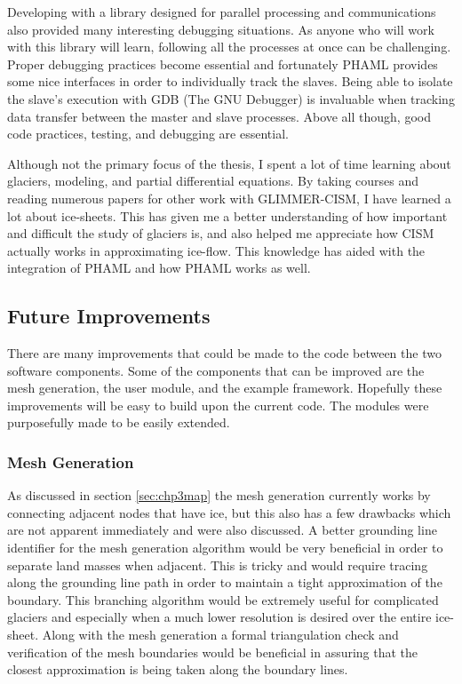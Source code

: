 Developing with a library designed for parallel processing and communications also provided many interesting debugging situations.  As anyone who will work with this library will learn, following all the processes at once can be challenging.  Proper debugging practices become essential and fortunately PHAML provides some nice interfaces in order to individually track the slaves.  Being able to isolate the slave's execution with GDB (The GNU Debugger) is invaluable when tracking data transfer between the master and slave processes.  Above all though, good code practices, testing, and debugging are essential.

Although not the primary focus of the thesis, I spent a lot of time learning about glaciers, modeling, and partial differential equations.  By taking courses and reading numerous papers for other work with GLIMMER-CISM, I have learned a lot about ice-sheets.  This has given me a better understanding of how important and difficult the study of glaciers is, and also helped me appreciate how CISM actually works in approximating ice-flow.  This knowledge has aided with the integration of PHAML and how PHAML works as well.




\subsection{Future Improvements}\label{sec:chp6improv}

There are many improvements that could be made to the code between the two software components.  Some of the components that can be improved are the mesh generation, the user module, and the example framework.  Hopefully these improvements will be easy to build upon the current code.  The modules were purposefully made to be easily extended.

\subsubsection{Mesh Generation}
As discussed in section \ref{sec:chp3map} the mesh generation currently works by connecting adjacent nodes that have ice, but this also has a few drawbacks which are not apparent immediately and were also discussed.  A better grounding line identifier for the mesh generation algorithm would be very beneficial in order to separate land masses when adjacent.  This is tricky and would require tracing along the grounding line path in order to maintain a tight approximation of the boundary.  This branching algorithm would be extremely useful for complicated glaciers and especially when a much lower resolution is desired over the entire ice-sheet. Along with the mesh generation a formal triangulation check and verification of the mesh boundaries would be beneficial in assuring that the closest approximation is being taken along the boundary lines.

